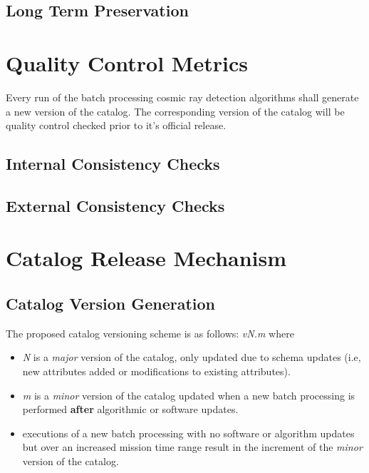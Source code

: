 \documentclass[a4paper, 11pt]{article}
\begin{document}
\subsection{Long Term Preservation}

\section{Quality Control Metrics}
\label{sec:metrics}
Every run of the batch processing cosmic ray detection algorithms shall generate a new version of the catalog. The corresponding version of the catalog will be quality control checked prior to it's official release.

\subsection{Internal Consistency Checks}

\subsection{External Consistency Checks}

\section{Catalog Release Mechanism}
\label{sec:release}
\subsection{Catalog Version Generation}

The proposed catalog versioning scheme is as follows: \newline\newline  \textit{vN.m} \newline\newline where 

\begin{itemize}
\item \textit{N} is a \textit{major} version of the catalog, only updated due to schema updates (i.e, new attributes added or modifications to existing attributes).
\item \textit{m} is a \textit{minor} version of the catalog updated when a new batch processing is performed \textbf{after} algorithmic or software updates. 
\item executions of a new batch processing with no software or algorithm updates but over an increased mission time range result in the increment of the \textit{minor} version of the catalog.

\end{itemize}
\end{document}

